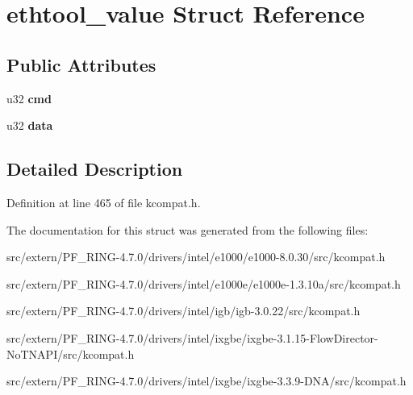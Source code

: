 \hypertarget{structethtool__value}{
\section{ethtool\_\-value Struct Reference}
\label{structethtool__value}
}
\subsection*{Public Attributes}
\begin{DoxyCompactItemize}
\item 
\hypertarget{structethtool__value_a6e3bffaf0e048a10bec4dac69f3247fe}{
u32 {\bfseries cmd}}
\label{structethtool__value_a6e3bffaf0e048a10bec4dac69f3247fe}

\item 
\hypertarget{structethtool__value_a6ecb12f6675bf06325bc2f8b55aaf1d7}{
u32 {\bfseries data}}
\label{structethtool__value_a6ecb12f6675bf06325bc2f8b55aaf1d7}

\end{DoxyCompactItemize}


\subsection{Detailed Description}


Definition at line 465 of file kcompat.h.



The documentation for this struct was generated from the following files:\begin{DoxyCompactItemize}
\item 
src/extern/PF\_\-RING-\/4.7.0/drivers/intel/e1000/e1000-\/8.0.30/src/kcompat.h\item 
src/extern/PF\_\-RING-\/4.7.0/drivers/intel/e1000e/e1000e-\/1.3.10a/src/kcompat.h\item 
src/extern/PF\_\-RING-\/4.7.0/drivers/intel/igb/igb-\/3.0.22/src/kcompat.h\item 
src/extern/PF\_\-RING-\/4.7.0/drivers/intel/ixgbe/ixgbe-\/3.1.15-\/FlowDirector-\/NoTNAPI/src/kcompat.h\item 
src/extern/PF\_\-RING-\/4.7.0/drivers/intel/ixgbe/ixgbe-\/3.3.9-\/DNA/src/kcompat.h\end{DoxyCompactItemize}
